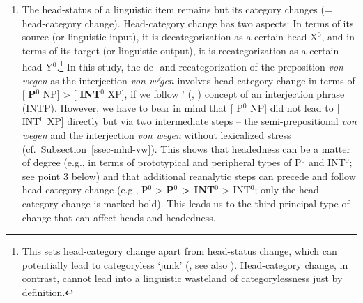 \documentclass[output=paper
  ,nobabel
  ,draftmode
  ,babelshorthands
  ,colorlinks, citecolor=brown
]{langscibook}
\begin{document}
\begin{enumerate}
    \item	The head-status of a linguistic item remains but its category changes (= head-category change). Head-category change has two aspects: In terms of its source (or linguistic input), it is decategorization as a certain head X$^0$, and in terms of its target (or linguistic output), it is recategorization as a certain head Y$^0$.\footnote{This sets head-category change apart from head-status change, which can potentially lead to categoryless `junk' (\citealp{Lass1990}, see also \citealp{Simon2010}). Head-category change, in contrast, cannot lead into a linguistic wasteland of categorylessness just by definition.}
    In this study, the de- and recategorization of the preposition \emph{von wegen} as the interjection \emph{von wégen} involves head-category change in terms of [ \textbf{P$^0$} NP] > [ \textbf{INT$^0$} XP], if we follow \citeauthor{Fries1992}' (\citeyear{Fries1992}, \citeyear{Fries22}) concept of an interjection phrase (INTP). However, we have to bear in mind that [ P$^0$ NP] did not lead to [ INT$^0$ XP] directly but via two intermediate steps – the semi-prepositional \emph{von wegen} and the interjection \emph{von wegen} without lexicalized stress (cf.\ Subsection~\ref{ssec-mhd-vw}). This shows that headedness can be a matter of degree (e.g., in terms of prototypical and peripheral types of P$^0$ and INT$^0$; see point 3 below) and that additional reanalytic steps can precede and follow head-category change (e.g., P$^0$ > \textbf{P$^0$ > INT$^0$} > INT$^0$; only the head-category change is marked bold). This leads us to the third principal type of change that can affect heads and headedness.
    

\end{enumerate}
\end{document}
